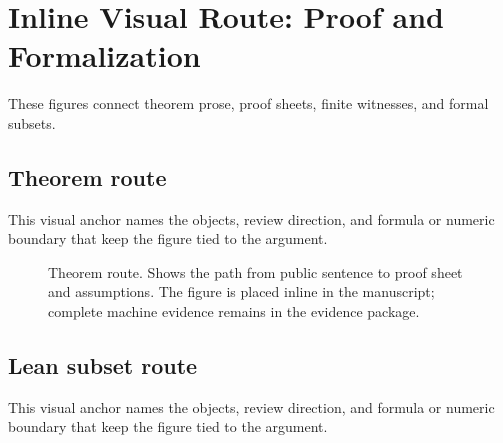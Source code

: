 \section{Inline Visual Route: Proof and Formalization}

These figures connect theorem prose, proof sheets, finite witnesses, and formal subsets.


\subsection{Theorem route}

This visual anchor names the objects, review direction, and formula or numeric boundary that keep the figure tied to the argument.


\begin{figure}[htbp]

\centering


\caption{Theorem route. Shows the path from public sentence to proof sheet and assumptions. The figure is placed inline in the manuscript; complete machine evidence remains in the evidence package.}

\label{fig:r005-inline-28b_oc133_inline_figures_proof_route-1}

\end{figure}

\subsection{Lean subset route}

This visual anchor names the objects, review direction, and formula or numeric boundary that keep the figure tied to the argument.



